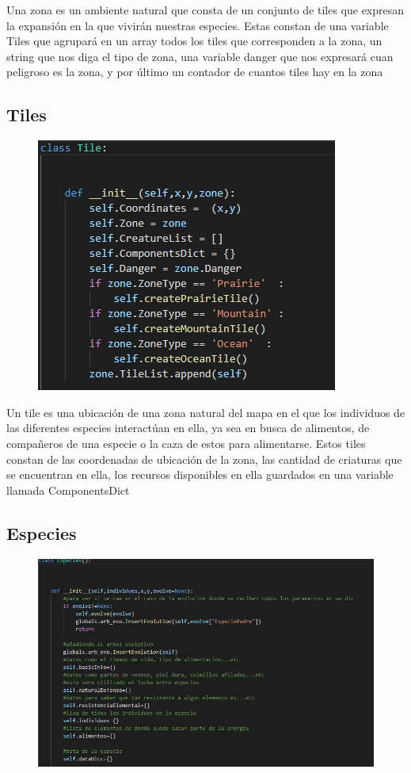 \documentclass{llncs}
\begin{document}
Una zona es un ambiente natural que consta de un conjunto de tiles que expresan la expansión en la que vivirán nuestras especies.
\newline
\newline
Estas constan de una variable Tiles que agrupará en un array todos los tiles que corresponden a la zona, un string que nos diga el tipo de zona, una variable danger que nos expresará cuan peligroso es la zona, y por último un contador de cuantos tiles hay en la zona


\subsection{Tiles}
\begin{figure}
	\centering
	\includegraphics[width=0.7\linewidth]{imagenes/Tile}
	\label{fig:tile}
\end{figure}

Un tile es una ubicación de una zona natural del mapa en el que los individuos de las diferentes especies interactúan en ella, ya sea en busca de alimentos, de compañeros de una especie o la caza de estos para alimentarse.
\newline
\newline
Estos tiles constan de las coordenadas de ubicación de la zona, las cantidad de criaturas que se encuentran en ella, los recursos disponibles en ella guardados en una variable llamada ComponentsDict

\subsection{Especies}
\begin{figure}
	\centering
	\includegraphics[width=0.7\linewidth]{imagenes/Especie}
	\label{fig:especie}
\end{figure}
\end{document}
